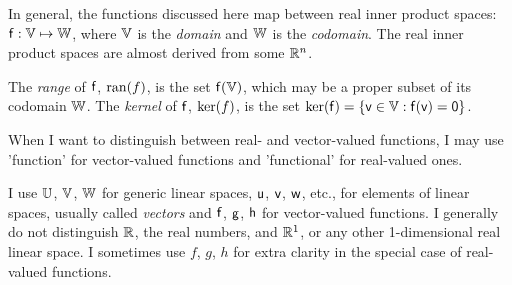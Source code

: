 \label{sec:affine-spaces}

\label{sec:Projective-spaces}

\label{sec:Oriented-projective-spaces}
\cite{Stolfi1991opg}
\setcounter{currentlevel}{\value{baseSectionLevel}}
\setcounter{currentlevel}{\value{baseSectionLevel}}
\label{sec:Manifolds}

\label{sec:functions}

In general, the functions discussed here map between real inner product spaces:
$\mathsf{f}:\mathbb{V} \mapsto \mathbb{W}$, where $\mathbb{V}$ is the
{\it domain} and $\mathbb{W}$ is the {\it codomain}.
The real inner product spaces are almost derived from some $\mathbb{R}^n$.

The {\it range} of $\mathsf{f}$, $\mathrm{ran}(f)$, is the set $\mathsf{f}(\mathbb{V})$,
which may be a proper subset of its codomain $\mathbb{W}$.
The {\it kernel} of $\mathsf{f}$, $\mathrm{ker}(f)$, is the set
$\mathrm{ker}(\mathsf{f}) = \{ \mathsf{v} \in \mathbb{V} : \mathsf{f}(\mathsf{v}) = {\mathsf 0} \}$.

When I want to distinguish between real- and vector-valued functions,
I may use 'function' for vector-valued functions and
'functional' for real-valued ones.

I use $\mathbb{U}$, $\mathbb{V}$, $\mathbb{W}$ for generic linear spaces,
$\mathsf{u}$, $\mathsf{v}$, $\mathsf{w}$, etc., for elements of linear spaces,
usually called \textit{vectors}
and
$\mathsf{f}$, $\mathsf{g}$, $\mathsf{h}$ for vector-valued functions.
I generally do not distinguish $\mathbb{R}$, the real numbers,
and $\mathbb{R}^1$, or any other 1-dimensional real linear space.
I sometimes use $f$, $g$, $h$ for extra clarity in the special
case of real-valued functions.

